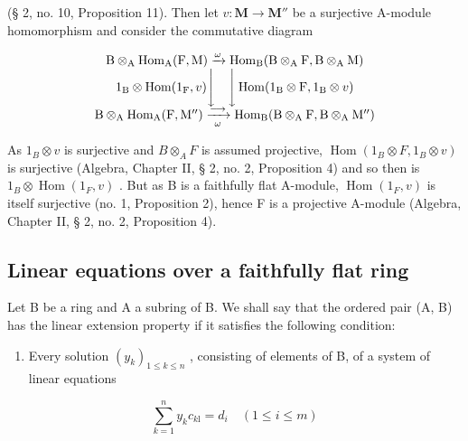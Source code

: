 (§ 2, no. 10, Proposition 11). Then let \(v: \mathbf{M} \to \mathbf{M}''\) be a surjective A-module homomorphism and consider the commutative diagram

\[
\begin{array}{c} \mathrm{B} \otimes_ {\mathrm{A}} \operatorname{Hom} _ {\mathrm{A}} (\mathrm{F}, \mathrm{M}) \xrightarrow {\omega} \operatorname{Hom} _ {\mathrm{B}} (\mathrm{B} \otimes_ {\mathrm{A}} \mathrm{F}, \mathrm{B} \otimes_ {\mathrm{A}} \mathrm{M}) \\ 1 _ {\mathrm{B}} \otimes \operatorname{Hom} (1 _ {\mathrm{F}}, v) \Bigg \downarrow \quad \Bigg \downarrow \operatorname{Hom} (1 _ {\mathrm{B}} \otimes \mathrm{F}, 1 _ {\mathrm{B}} \otimes v) \\ \mathrm{B} \otimes_ {\mathrm{A}} \operatorname{Hom} _ {\mathrm{A}} (\mathrm{F}, \mathrm{M} ^ {\prime \prime}) \xrightarrow [ \omega ]{\longrightarrow} \operatorname{Hom} _ {\mathrm{B}} (\mathrm{B} \otimes_ {\mathrm{A}} \mathrm{F}, \mathrm{B} \otimes_ {\mathrm{A}} \mathrm{M} ^ {\prime \prime}) \end{array}
\]

As \(1_{B} \otimes v\) is surjective and \(B \otimes_{A} F\) is assumed projective, \(\operatorname{Hom}(1_{B} \otimes F, 1_{B} \otimes v)\) is surjective (Algebra, Chapter II, § 2, no. 2, Proposition 4) and so then is \(1_{B} \otimes \operatorname{Hom}(1_{F}, v)\) . But as B is a faithfully flat A-module, \(\operatorname{Hom}(1_{F}, v)\) is itself surjective (no. 1, Proposition 2), hence F is a projective A-module (Algebra, Chapter II, § 2, no. 2, Proposition 4).

\subsection{Linear equations over a faithfully flat ring}

Let B be a ring and A a subring of B. We shall say that the ordered pair (A, B) has the linear extension property if it satisfies the following condition:

\begin{enumerate}
\def\labelenumi{(\Alph{enumi})}
\setcounter{enumi}{4}
\tightlist
\item
  Every solution \((y_{k})_{1\leqslant k\leqslant n}\) , consisting of elements of B, of a system of linear equations
\end{enumerate}

\[
\sum_ {k = 1} ^ {n} y _ {k} c _ {k \mathrm{l}} = d _ {i} \quad (1 \leqslant i \leqslant m)\tag{3}
\]

